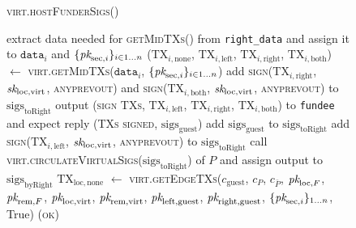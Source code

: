 \begin{figure}[H]
  \begin{processbox}{\textsc{virt.hostFunderSigs}()}
    \begin{algorithmic}[1]
        \State extract data needed for \textsc{getMidTXs}() from
        \texttt{right\_data} and assign it to $\texttt{data}_i$ and
        $\{\textit{pk}_{\mathrm{sec}, i}\}_{i \in 1 \dots n}$
        \State ($\mathrm{TX}_{i, \mathrm{none}}$, $\mathrm{TX}_{i,
        \mathrm{left}}$, $\mathrm{TX}_{i, \mathrm{right}}$, $\mathrm{TX}_{i,
        \mathrm{both}}$) $\gets$ \textsc{virt.getMidTXs}($\texttt{data}_i$,
        $\{\textit{pk}_{\mathrm{sec}, i}\}_{i \in 1 \dots n}$)
        \State add \textsc{sign}($\mathrm{TX}_{i, \mathrm{right}}$,
        $\textit{sk}_{\mathrm{loc}, \mathrm{virt}}$, \textsc{anyprevout}) and
        \textsc{sign}($\mathrm{TX}_{i, \mathrm{both}}$, $\textit{sk}_{\mathrm{loc},
        \mathrm{virt}}$, \textsc{anyprevout}) to
        $\mathrm{sigs}_{\mathrm{toRight}}$ 
        \State output (\textsc{sign TXs}, $\mathrm{TX}_{i, \mathrm{left}}$,
        $\mathrm{TX}_{i, \mathrm{right}}$, $\mathrm{TX}_{i, \mathrm{both}}$)
        to \texttt{fundee} and expect reply (\textsc{TXs signed},
        $\mathrm{sigs}_{\mathrm{guest}}$)
        \State add $\mathrm{sigs}_{\mathrm{guest}}$ to
        $\mathrm{sigs}_{\mathrm{toRight}}$
         
          \State add \textsc{sign}($\mathrm{TX}_{i, \mathrm{left}}$,
          $\textit{sk}_{\mathrm{loc}, \mathrm{virt}}$, \textsc{anyprevout}) to
          $\mathrm{sigs}_{\mathrm{toRight}}$
        \EndIf
      \EndFor
      \State call
      \textsc{virt.circulateVirtualSigs}($\mathrm{sigs}_{\mathrm{toRight}}$)
      of $P$ and assign output to $\mathrm{sigs}_{\mathrm{byRight}}$
      \State $\mathrm{TX}_{\mathrm{loc}, \mathrm{none}}$ $\gets$
      \textsc{virt.getEdgeTXs}($c_{\mathrm{guest}}$, $c_P$, $c_{\bar{P}}$,
      $\textit{pk}_{\mathrm{loc}, F}$, $\textit{pk}_{\mathrm{rem}, F}$, $\textit{pk}_{\mathrm{loc},
      \mathrm{virt}}$, $\textit{pk}_{\mathrm{rem}, \mathrm{virt}}$, $\textit{pk}_{\mathrm{left},
      \mathrm{guest}}$, $\textit{pk}_{\mathrm{right}, \mathrm{guest}}$,
      $\{\textit{pk}_{\mathrm{sec}, i}\}_{1 \dots n}$, True)
      \label{code:virtual-layer:funder-sigs:tx-none}
      \State \Return (\textsc{ok})
    \end{algorithmic}
  \end{processbox}
  \caption{}
  \label{code:virtual-layer:funder-sigs}
\end{figure}

